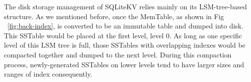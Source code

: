 	The disk storage management of SQLiteKV relies mainly on its LSM-tree-based structure. As we mentioned before, once the MemTable, as shown in Fig ~\ref{fig:back-index}, is converted to be an immutable table and dumped into disk. This SSTable would be placed at the first level, level 0. As long as one specific level of this LSM tree is full, those SSTables with overlapping indexes would be compacted together and dumped to the next level. During this compaction process, newly-generated SSTables on lower levels tend to have larger  sizes and ranges of index consequently. 

